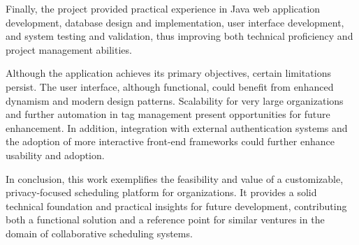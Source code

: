 Finally, the project provided practical experience in Java web application development, database design and implementation, user interface development, and system testing and validation, thus improving both technical proficiency and project management abilities.

Although the application achieves its primary objectives, certain limitations persist.
The user interface, although functional, could benefit from enhanced dynamism and modern design patterns.
Scalability for very large organizations and further automation in tag management present opportunities for future enhancement.
In addition, integration with external authentication systems and the adoption of more interactive front-end frameworks could further enhance usability and adoption.

In conclusion, this work exemplifies the feasibility and value of a customizable, privacy-focused scheduling platform for organizations.
It provides a solid technical foundation and practical insights for future development, contributing both a functional solution and a reference point for similar ventures in the domain of collaborative scheduling systems.